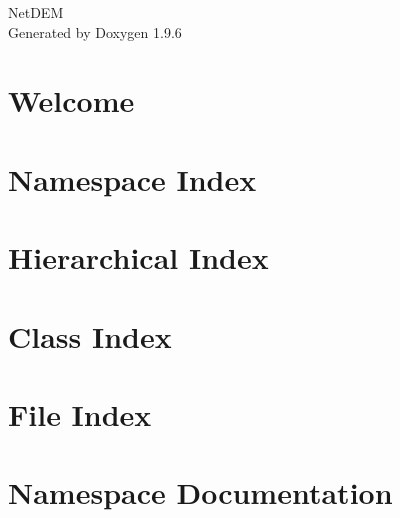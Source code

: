\documentclass[twoside]{book}
\newcommand{\+}{\discretionary{\mbox{\scriptsize$\hookleftarrow$}}{}{}}
\newcommand{\clearemptydoublepage}{%
    \newpage{\pagestyle{empty}\cleardoublepage}%
  }
\begin{document}
  \raggedbottom
    \hypersetup{pageanchor=false,
                bookmarksnumbered=true,
                pdfencoding=unicode
               }
  \begin{titlepage}
  \vspace*{7cm}
  \begin{center}%
  {\Large Net\+DEM}\\
  \vspace*{1cm}
  {\large Generated by Doxygen 1.9.6}\\
  \end{center}
  \end{titlepage}
  \clearemptydoublepage
  \tableofcontents
  \clearemptydoublepage
  \hypersetup{pageanchor=true}
\chapter{Welcome}
\label{index}\hypertarget{index}{}
\chapter{Namespace Index}

\chapter{Hierarchical Index}

\chapter{Class Index}

\chapter{File Index}

\chapter{Namespace Documentation}





\end{document}
